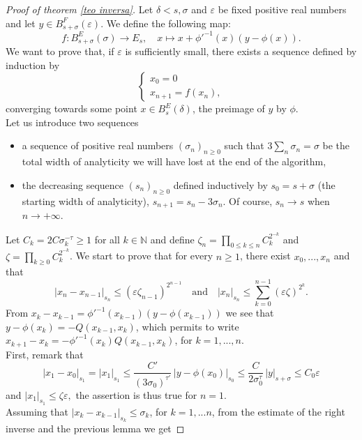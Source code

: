 \documentclass[oneside, 11pt]{amsbook}
\newcommand{\abs}[1]{{\left|#1\right|}}
\newcommand{\eps}{\varepsilon}
\newcommand{\eqsys}[1]{{\left\{\begin{array}{ll}#1\end{array}\right.}}
\newcommand{\inderiv}[1]{#1'^{-1}}
\newcommand{\0}{{(0)}}
\newcommand{\3}{{(3)}}
\numberwithin{equation}{section}
\numberwithin{defn}{section}
\numberwithin{prop}{section}
\numberwithin{cor}{section}
\numberwithin{lemma}{section}
\numberwithin{rmk}{section}
\numberwithin{corollary}{section}
\begin{document}
\begin{proof}[Proof of theorem \ref{teo inversa}]
Let $\delta<s, \sigma $ and $\eps$ be fixed positive real numbers and let $y\in B^F_{s+\sigma}(\eps)$. We define the following map: 
\begin{equation*}
f: B^E_{s+\sigma}(\sigma)\to E_s,\quad x\mapsto x + \inderiv{\phi}(x)(y - \phi(x)).
\end{equation*}
We want to prove that, if $\eps$ is sufficiently small, there exists a sequence defined by induction by
\begin{equation*}
\eqsys{x_0 = 0\\
x_{n+1} = f(x_n) ,}
\end{equation*}
converging towards some point $x\in B^E_s(\delta)$, the preimage of $y$ by $\phi$.\\ Let us introduce two sequences
\begin{itemize}[leftmargin=*]
\item a sequence of positive real numbers $(\sigma_n)_{n\geq 0}$ such that $3\sum_n \sigma_n = \sigma$ be the total width of analyticity we will have lost at the end of the algorithm,
\item the decreasing sequence $(s_n)_{n\geq 0}$ defined inductively by $s_0 = s + \sigma$ (the starting width of analyticity), $s_{n+1}= s_n - 3\sigma_n$. Of course, $s_n\to s$ when $n\to + \infty$.
\end{itemize}  
Let $C_k = 2C \sigma_k^{-\tau} \geq 1$ for all $k \in \mathbb{N}$ and define $\zeta_n = \prod_{0\leq k \leq n} C_k^{2^{-k}} $ and $\zeta = \prod_{k\geq 0} C_k^{2^{-k}}$. We start to prove that for every $n\geq 1$, there exist $x_0,...,x_{n}$ and that $$\abs{x_{n} - x_{n-1}}_{s_n}\leq (\eps \zeta_{n-1})^{2^{n-1}}\quad \text{and} \quad \abs{x_{n}}_{s_{n}} \leq \sum_{k= 0}^{n-1} (\eps\zeta)^{2^k}.$$  From $x_{k} - x_{k-1} =  \inderiv{\phi}(x_{k-1})(y - \phi(x_{k-1}))$ we see that $y - \phi(x_k) = - Q(x_{k-1},x_k)$, which permits to write $x_{k+1} - x_k = - \inderiv{\phi}(x_k)Q(x_{k-1},x_k)$, for $k= 1,...,n$.\\ 
First, remark that $$\abs{x_1 - x_0}_{s_1} = \abs{x_1}_{s_1} \leq \frac{C'}{(3\sigma_0)^{\tau'}}\,\abs{y-\phi(x_0)}_{s_0}\leq \frac{C}{2\sigma^{\tau}_0}\,\abs{y}_{s+\sigma}\leq C_0\eps $$
and $\abs{x_1}_{s_1} \leq \zeta\eps,$ the assertion is thus true for $n=1$.\\ 
Assuming that $\abs{x_{k} - x_{k-1}}_{s_k}\leq \sigma_k$, for $k=1,...n$, from the estimate of the right inverse and the previous lemma we get 


\end{proof}
\end{document}

